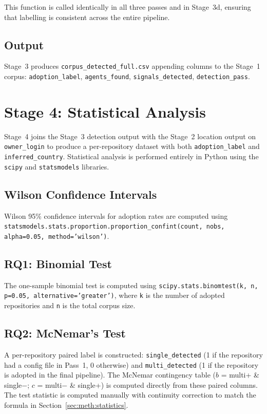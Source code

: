 This function is called identically in all three passes and in Stage~3d, ensuring that labelling is consistent across the entire pipeline.

\subsection{Output}

Stage~3 produces \texttt{corpus\_detected\_full.csv} appending columns to the Stage~1 corpus: \texttt{adoption\_label}, \texttt{agents\_found}, \texttt{signals\_detected}, \texttt{detection\_pass}.

\section{Stage 4: Statistical Analysis}
\label{sec:impl:statistics}

Stage~4 joins the Stage~3 detection output with the Stage~2 location output on \texttt{owner\_login} to produce a per-repository dataset with both \texttt{adoption\_label} and \texttt{inferred\_country}. Statistical analysis is performed entirely in Python using the \texttt{scipy} and \texttt{statsmodels} libraries.

\subsection{Wilson Confidence Intervals}

Wilson 95\% confidence intervals for adoption rates are computed using \texttt{statsmodels.stats.proportion.proportion\_confint(count, nobs, alpha=0.05, method='wilson')}.

\subsection{RQ1: Binomial Test}

The one-sample binomial test is computed using \texttt{scipy.stats.binomtest(k, n, p=0.05, alternative='greater')}, where \texttt{k} is the number of adopted repositories and \texttt{n} is the total corpus size.

\subsection{RQ2: McNemar's Test}

A per-repository paired label is constructed: \texttt{single\_detected} (1 if the repository had a config file in Pass~1, 0 otherwise) and \texttt{multi\_detected} (1 if the repository is adopted in the final pipeline). The McNemar contingency table ($b$ = multi+ \& single$-$; $c$ = multi$-$ \& single+) is computed directly from these paired columns. The test statistic is computed manually with continuity correction to match the formula in Section~\ref{sec:meth:statistics}.

